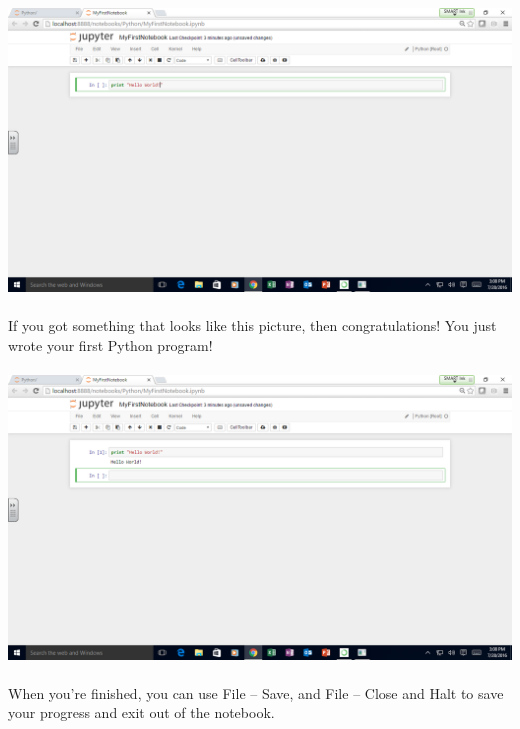 \documentclass[]{article}
\begin{document}
\paragraph{}
\begin{centering}
    \centerline{\includegraphics[scale=0.35]{Screenshot_23.png}}
\end{centering}

\paragraph{}
If you got something that looks like this picture, then congratulations! You just wrote your first Python program!
\paragraph{}
\begin{centering}
    \centerline{\includegraphics[scale=0.35]{Screenshot_24.png}}
\end{centering}

\paragraph{}
When you're finished, you can use File -- Save, and File -- Close and Halt to save your progress and exit out of the notebook.
\end{document}
